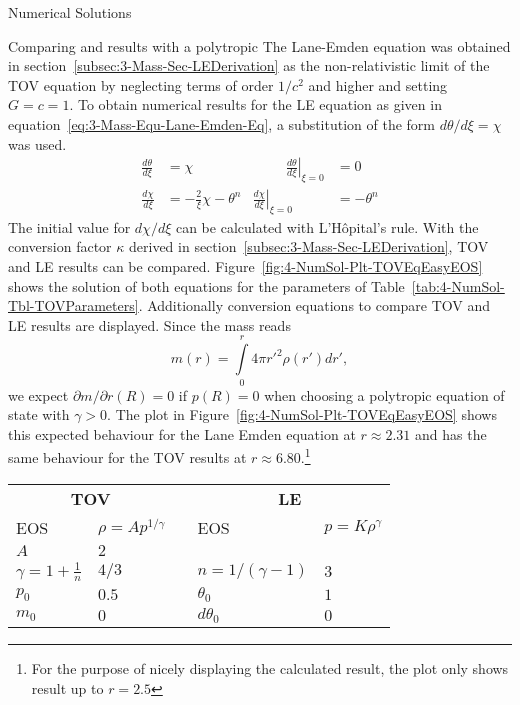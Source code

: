 \begin{section}{Numerical Solutions}
\begin{subsection}{Comparing \texorpdfstring{}{TOV} and \texorpdfstring{}{LE} results with a polytropic \texorpdfstring{}{EoS}}
The Lane-Emden equation was obtained in section~\ref{subsec:3-Mass-Sec-LEDerivation} as the non-relativistic limit of the \ac{TOV} equation by neglecting terms of order $1/c^2$ and higher and setting $G=c=1$.
To obtain numerical results for the \ac{LE} equation as given in equation~\eqref{eq:3-Mass-Equ-Lane-Emden-Eq}, a substitution of the form $d\theta/d\xi=\chi$ was used.
\begin{equation}
	\begin{aligned}
		\frac{d\theta}{d\xi} &= \chi &\hspace{1cm} \left.\frac{d\theta}{d\xi}\right|_{\xi=0} &= 0\\
		\frac{d\chi}{d\xi} &= -\frac{2}{\xi}\chi-\theta^n & \left.\frac{d\chi}{d\xi}\right|_{\xi=0} &= -\theta^n
		\label{eq:4-NumSol-Equ-LE-Substitution}
	\end{aligned}
\end{equation}
The initial value for $d\chi/d\xi$ can be calculated with L'Hôpital's rule.
With the conversion factor $\kappa$ derived in section~\ref{subsec:3-Mass-Sec-LEDerivation}, \ac{TOV} and \ac{LE} results can be compared.
Figure~\ref{fig:4-NumSol-Plt-TOVEqEasyEOS} shows the solution of both equations for the parameters of Table~\ref{tab:4-NumSol-Tbl-TOVParameters}.
Additionally conversion equations to compare \ac{TOV} and \ac{LE} results are displayed.
Since the mass reads
\[
	m(r) = \int\limits_0^r 4\pi r'^2\rho(r')dr',
\]
we expect $\partial m/\partial r(R)=0$ if $p(R)=0$ when choosing a polytropic equation of state with $\gamma>0$.
The plot in Figure~\ref{fig:4-NumSol-Plt-TOVEqEasyEOS} shows this expected behaviour for the Lane Emden equation at $r\approx2.31$ and has the same behaviour for the \ac{TOV} results at $r\approx6.80$.\footnote{For the purpose of nicely displaying the calculated result, the plot only shows result up to $r=2.5$}
\begin{table}
	{\renewcommand{\arraystretch}{1.2}
	\centering
	\begin{tabular}{@{}llcll@{}}
		\toprule
		\multicolumn{2}{c}{\textbf{TOV}} & \phantom{b} &\multicolumn{2}{c}{\textbf{LE}}\\
		\cmidrule{1-2} \cmidrule{4-5}
		EOS & $\rho=Ap^{1/\gamma}$ && EOS & $p=K\rho^{\gamma}$\\
		$A$ & $2$ & & \\
		$\gamma=1+\frac{1}{n}$ & $4/3$ && $n=1/(\gamma-1)$ & $3$\\
		$p_0$ & $0.5$ && $\theta_0$ & $1$\\
		$m_0$ & $0$ && $d\theta_0$ & $0$\\

\end{tabular}}
\end{table}
\end{subsection}
\end{section}
